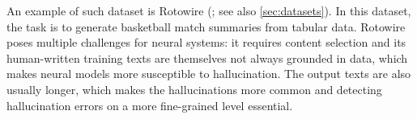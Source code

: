 An example of such dataset is Rotowire (\citealp{wiseman2017challenges}; see also \autoref{sec:datasets}). In this dataset, the task is to generate basketball match summaries from tabular data. Rotowire poses multiple challenges for neural systems: it requires content selection and its human-written training texts are themselves not always grounded in data, which makes neural models more susceptible to hallucination.
The output texts are also usually longer, which makes the hallucinations more common and detecting hallucination errors on a more fine-grained level essential.



